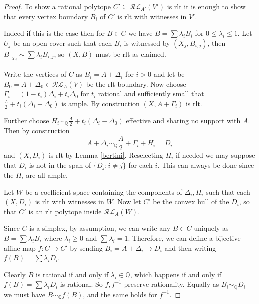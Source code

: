 	\begin{proof}
		To show a rational polytope $C'\subseteq \mathcal{RL}_{A'}(V')$ is rlt it is enough to show that every vertex boundary $B_{i}$ of $C'$ is rlt with witnesses in $V'$.
				
		Indeed if this is the case then for $B \in C$ we have $B= \sum \lambda_{i} B_{i}$ for $0 \leq \lambda_{i} \leq 1$. Let $U_{j}$ be an open cover such that each $B_{i}$ is witnessed by $(X_{j},B_{i,j})$, then $B|_{X_{j}}\sim \sum \lambda_{i}B_{i,j}$, so $(X,B)$ must be rlt as claimed.
		
		
		
		Write the vertices of $C$ as $B_{i}=A+\Delta_{i}$ for $i > 0$ and let be $B_{0}=A+\Delta_{0} \in \mathcal{RL}_{A}(V)$ be the rlt boundary. Now choose $\Gamma_{i} =(1-t_{i})\Delta_{i}+t_{i}\Delta_{0}$ for $t_{i}$ rational and sufficiently small that $\frac{A}{2}+t_{i}(\Delta_{i}-\Delta_{0})$ is ample. By construction $(X,A+\Gamma_{i})$ is rlt.
		
		Further choose $H_{i} \sim_{\mathbb{Q}} \frac{A}{2}+t_{i}(\Delta_{i}-\Delta_{0})$ effective and sharing no support with $A$. Then by construction
		\[A+\Delta_{i} \sim_{\mathbb{Q}} \frac{A}{2}+\Gamma_{i}+H_{i}=D_{i}\]
		and $(X,D_{i})$ is rlt by Lemma \ref{bertini}. Reselecting $H_{i}$ if needed we may suppose that $D_{i}$ is not in the span of $\{D_{j}: i \neq j\}$ for each $i$. This can always be done since the $H_{i}$ are all ample.
		
		Let $W$ be a coefficient space containing the components of $\Delta_{i}, H_{i}$ such that each $(X,D_{i})$ is rlt with witnesses in $W$. Now let $C'$ be the convex hull of the $D_{i}$, so that $C'$ is an rlt polytope inside $\mathcal{RL}_{A}(W)$.
		
		Since $C$ is a simplex, by assumption, we can write any $B \in C$ uniquely as $B=\sum \lambda_{i} B_{i}$ where $\lambda_{i} \geq 0$ and $\sum \lambda_{i} =1$. Therefore, we can define a bijective affine map $f: C \to C'$ by sending $B_{i}=A+\Delta_{i} \to D_{i}$ and then writing $f(B)= \sum \lambda_{i} D_{i}$.
		
		Clearly $B$ is rational if and only if $\lambda_{i} \in \mathbb{Q}$, which happens if and only if $f(B)=\sum \lambda_{i} D_{i}$ is rational. So $f, f^{-1}$ preserve rationality. Equally as $B_{i} \sim_{\mathbb{Q}} D_{i}$ we must have $B \sim_{\mathbb{Q}} f(B)$, and the same holds for $f^{-1}$.
			
	\end{proof}

